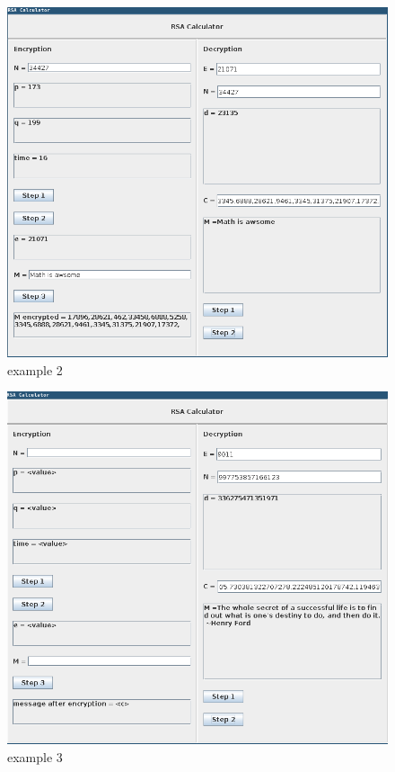 \begin{figure}[h]
    \includegraphics[width=\linewidth]{images/example_2}
    \caption{example 2}
    \label{fig:example 2}
\end{figure}

\begin{figure}[h]
    \includegraphics[width=\linewidth]{images/example_3}
    \caption{example 3}
    \label{fig:example 3}
\end{figure}